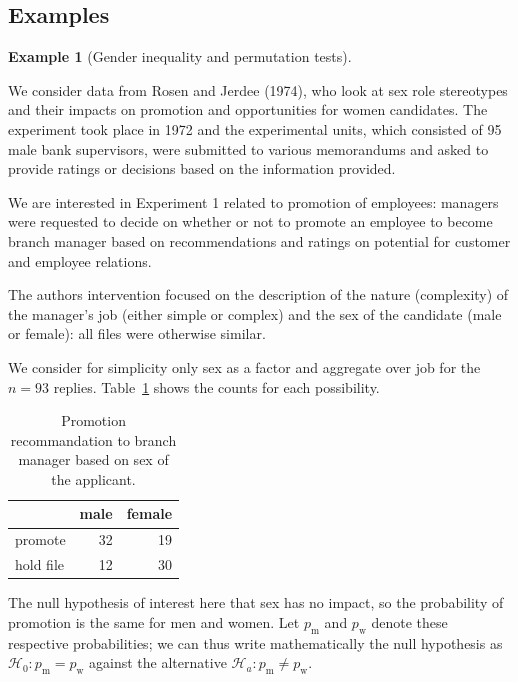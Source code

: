 \documentclass[
  11pt,
  letterpaper,
]{scrbook}
\theoremstyle{definition}
\newtheorem{example}{Example}[chapter]
\theoremstyle{definition}
\theoremstyle{remark}
\begin{document}
\subsection{Examples}\label{examples}

\begin{example}[Gender inequality and permutation
tests]\protect\hypertarget{exm-rosenjerdee74}{}\label{exm-rosenjerdee74}

We consider data from Rosen and Jerdee (1974), who look at sex role
stereotypes and their impacts on promotion and opportunities for women
candidates. The experiment took place in 1972 and the experimental
units, which consisted of 95 male bank supervisors, were submitted to
various memorandums and asked to provide ratings or decisions based on
the information provided.

We are interested in Experiment 1 related to promotion of employees:
managers were requested to decide on whether or not to promote an
employee to become branch manager based on recommendations and ratings
on potential for customer and employee relations.

The authors intervention focused on the description of the nature
(complexity) of the manager's job (either simple or complex) and the sex
of the candidate (male or female): all files were otherwise similar.

We consider for simplicity only sex as a factor and aggregate over job
for the \(n=93\) replies. Table~\ref{tbl-rosen-table1} shows the counts
for each possibility.

\begin{longtable}[t]{lrr}

\caption{\label{tbl-rosen-table1}Promotion recommandation to branch
manager based on sex of the applicant.}

\tabularnewline

\toprule
 & male & female\\
\midrule
promote & 32 & 19\\
hold file & 12 & 30\\
\bottomrule

\end{longtable}

The null hypothesis of interest here that sex has no impact, so the
probability of promotion is the same for men and women. Let
\(p_{\text{m}}\) and \(p_{\text{w}}\) denote these respective
probabilities; we can thus write mathematically the null hypothesis as
\(\mathscr{H}_0: p_{\text{m}} = p_{\text{w}}\) against the alternative
\(\mathscr{H}_a: p_{\text{m}} \neq p_{\text{w}}\).


\end{example}
\end{document}
